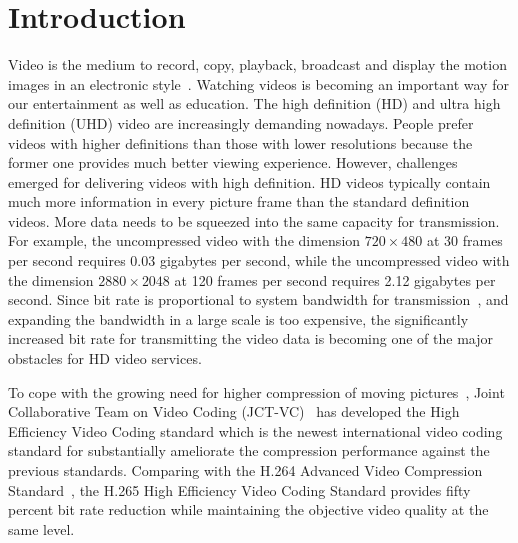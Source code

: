 \chapter{Introduction}\label{ch:chapter1} %

Video is the medium to record, copy, playback, broadcast
and display the motion images in an electronic style~\parencite{RN190}.
Watching videos is becoming an important way for our entertainment as well
as education.
The high definition (HD) and ultra high definition (UHD) video
are increasingly demanding nowadays.
People prefer videos with higher definitions than those with lower
resolutions because the former one provides much better viewing experience.
However, challenges emerged for delivering videos with high definition.
HD videos typically contain much more information in every picture frame than the
standard definition videos.
More data needs to be squeezed into the same capacity for transmission.
For example, the uncompressed video with the dimension \(720\times480\) at 30 frames
per second requires 0.03 gigabytes per second, while the uncompressed video with
the dimension \(2880\times2048\) at 120 frames per second requires 2.12 gigabytes per
second.
Since bit rate is proportional to system bandwidth for
transmission~\parencite{RN191}, and expanding the bandwidth in a large scale is
too expensive, the significantly increased bit rate
for transmitting the video data is becoming one of the
major obstacles for HD video services.

To cope with the growing need for higher compression of moving
pictures~\parencite{RN193}, Joint Collaborative Team on Video
Coding (JCT-VC)~\parencite{RN192} has developed the High Efficiency Video
Coding standard which is the newest international video coding standard for
substantially ameliorate the compression performance against the previous
standards.
Comparing with the H.264 Advanced Video Compression Standard~\parencite{RN194},
the H.265 High Efficiency Video Coding Standard provides fifty percent bit rate
reduction while maintaining the objective video quality at the same level.

